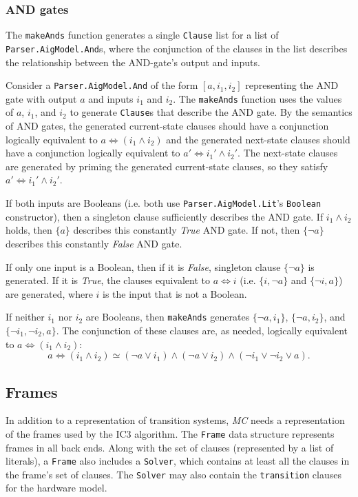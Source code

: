 \documentclass[12pt,a4paper,twoside,openright]{report}
\begin{document}
{{\subsubsection{AND gates}
The \verb,makeAnds, function generates a single \verb,Clause, list for a list of \verb,Parser.AigModel.And,s,
where the conjunction of the clauses in the list describes the relationship between the AND-gate's output
and inputs.

Consider a \verb,Parser.AigModel.And, of the form $[a, i_1, i_2]$ representing the AND gate
with output $a$ and inputs $i_1$ and $i_2$.
The \verb,makeAnds, function uses the values of $a$, $i_1$, and $i_2$ to generate
\verb,Clause,s that describe the AND gate.
By the semantics of AND gates, the generated current-state clauses should have a conjunction
logically equivalent to $a \Leftrightarrow (i_1 \wedge i_2)$ and the generated next-state
clauses should have a conjunction logically equivalent to
$a' \Leftrightarrow i_1' \wedge i_2'$. The next-state clauses are generated
by priming the generated current-state clauses, so they satisfy
$a' \Leftrightarrow i_1' \wedge i_2'$.

If both inputs are Booleans (i.e. both use \verb,Parser.AigModel.Lit,'s \verb,Boolean,
constructor), then a singleton clause sufficiently describes the AND gate.
If $i_1 \wedge i_2$ holds, then $\{a\}$ describes this constantly {\it True} AND gate.
If not, then $\{\neg a\}$ describes this constantly {\it False} AND gate.

If only one input is a Boolean, then if it is {\it False},
singleton clause $\{\neg a\}$ is generated. If it is {\it True},
the clauses equivalent to $a \Leftrightarrow i$ (i.e.
$\{i, \neg a\}$ and $\{\neg i, a\}$)
are generated, where $i$ is the input that is not a Boolean.

If neither $i_1$ nor $i_2$ are Booleans, then \verb,makeAnds, generates
$\{\neg a, i_1\}$, $\{\neg a, i_2\}$, and
$\{\neg i_1,\neg i_2, a\}$. The conjunction of these clauses are, as needed,
logically equivalent to $a \Leftrightarrow (i_1 \wedge i_2)$:
$$a \Leftrightarrow (i_1 \wedge i_2) \simeq
(\neg a \vee i_1) \wedge (\neg a \vee i_2) \wedge (\neg i_1 \vee \neg i_2 \vee a).$$

\subsection{Frames}
In addition to a representation of transition systems, \emph{MC} needs a representation
of the frames used by the IC3 algorithm.
The \verb,Frame, data structure represents frames in all back ends.
Along with the set of clauses (represented by a list of literals), a \verb,Frame, also
includes a \verb,Solver,, which contains at least all the clauses in the frame's set
of clauses.
The \verb,Solver, may also contain the \verb,transition, clauses for the hardware model.

}}
\end{document}
